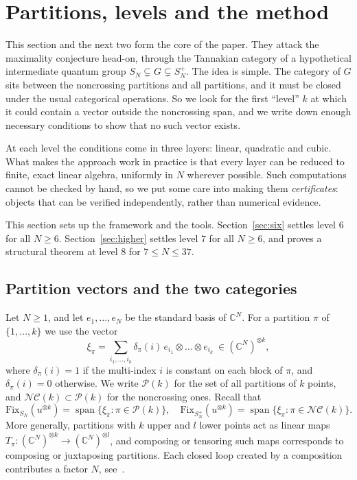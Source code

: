 \documentclass[11pt]{amsart}
\theoremstyle{definition}
\theoremstyle{remark}
\theoremstyle{plain}
\numberwithin{equation}{section}
\numberwithin{table}{section}
\newcommand{\C}{\mathbb C}
\newcommand{\Fix}{\mathrm{Fix}}
\newcommand{\NC}{\mathcal{NC}}
\newcommand{\Pp}{\mathcal{P}}
\DeclareMathOperator{\spn}{span}
\begin{document}
\section{Partitions, levels and the method}\label{sec:method}

This section and the next two form the core of the paper. They attack the maximality conjecture head-on, through the Tannakian category of a hypothetical intermediate quantum group $S_N\subsetneq G\subsetneq S_N^+$. The idea is simple. The category of $G$ sits between the noncrossing partitions and all partitions, and it must be closed under the usual categorical operations. So we look for the first ``level'' $k$ at which it could contain a vector outside the noncrossing span, and we write down enough necessary conditions to show that no such vector exists.

At each level the conditions come in three layers: linear, quadratic and cubic. What makes the approach work in practice is that every layer can be reduced to finite, exact linear algebra, uniformly in $N$ wherever possible. Such computations cannot be checked by hand, so we put some care into making them \emph{certificates}: objects that can be verified independently, rather than numerical evidence.

This section sets up the framework and the tools. Section~\ref{sec:six} settles level $6$ for all $N\ge6$. Section~\ref{sec:higher} settles level $7$ for all $N\ge6$, and proves a structural theorem at level $8$ for $7\le N\le37$.

\subsection{Partition vectors and the two categories}

Let $N\ge1$, and let $e_1,\dots,e_N$ be the standard basis of $\C^N$. For a partition $\pi$ of $\{1,\dots,k\}$ we use the vector
\[
\xi_\pi=\sum_{i_1,\dots,i_k}\delta_\pi(i)\,e_{i_1}\otimes\dots\otimes e_{i_k}\ \in(\C^N)^{\otimes k},
\]
where $\delta_\pi(i)=1$ if the multi-index $i$ is constant on each block of $\pi$, and $\delta_\pi(i)=0$ otherwise. We write $\Pp(k)$ for the set of all partitions of $k$ points, and $\NC(k)\subset\Pp(k)$ for the noncrossing ones. Recall that
\[
\Fix_{S_N}(u^{\otimes k})=\spn\{\xi_\pi:\pi\in\Pp(k)\},\quad
\Fix_{S_N^+}(u^{\otimes k})=\spn\{\xi_\pi:\pi\in\NC(k)\}.
\]
More generally, partitions with $k$ upper and $l$ lower points act as linear maps $T_\pi:(\C^N)^{\otimes k}\to(\C^N)^{\otimes l}$, and composing or tensoring such maps corresponds to composing or juxtaposing partitions. Each closed loop created by a composition contributes a factor $N$, see~\cite{bsp}.
\end{document}
